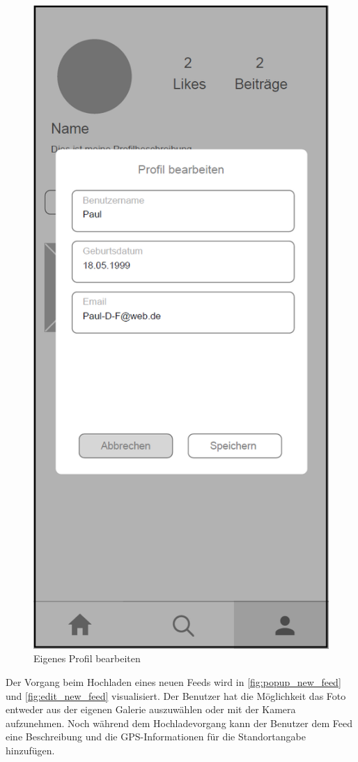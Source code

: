 \begin{figure}[H]
\begin{minipage}{.5\textwidth}
      \includegraphics[width=.6\linewidth]{images/Edit_Profil_MockUp.png}
      \caption{Eigenes Profil bearbeiten}
      \label{fig:edit_profil}
    \end{minipage}
\end{figure}

Der Vorgang beim Hochladen eines neuen Feeds wird in \autoref{fig:popup_new_feed} und \autoref{fig:edit_new_feed} visualisiert. Der Benutzer hat die Möglichkeit das Foto entweder aus der eigenen Galerie auszuwählen oder mit der Kamera aufzunehmen. Noch während dem Hochladevorgang kann der Benutzer dem Feed eine Beschreibung und die GPS-Informationen für die Standortangabe hinzufügen.

